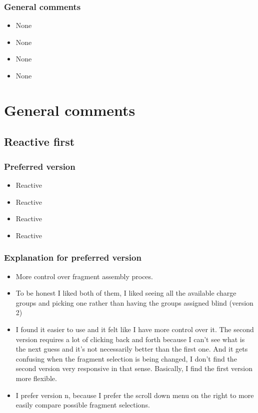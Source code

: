 \subsubsection{General comments}
\begin{itemize}
\item None

\item None

\item None

\item None

\end{itemize}


\section{General comments}
\subsection{Reactive first}
\subsubsection{Preferred version}
\begin{itemize}
\item Reactive

\item Reactive

\item Reactive

\item Reactive

\end{itemize}


\subsubsection{Explanation for preferred version}
\begin{itemize}
\item More control over fragment assembly proces. 

\item To be honest I liked both of them, I liked seeing all the available charge groups and picking one rather than having the groups assigned blind (version 2)

\item I found it easier to use and it felt like I have more control over it. The second version requires a lot of clicking back and forth because I can't see what is the next guess and it's not necessarily better than the first one. And it gets confusing when the fragment selection is being changed, I don't find the second version very responsive in that sense. Basically, I find the first version more flexible.

\item I prefer version n, because I prefer the scroll down menu on the right to more easily compare possible fragment selections.

\end{itemize}


